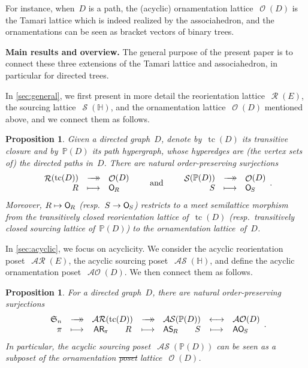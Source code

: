 \documentclass{amsart}
\newtheorem{proposition}[theorem]{Proposition}
\theoremstyle{definition}
\renewcommand{\c}[1]{\mathcal{#1}} %
\newcommand{\surjection}{\longrightarrow\mathrel{\mkern-22mu}\rightarrow\,}
\newcommand{\bijection}{\longleftrightarrow}
\DeclareMathOperator{\tc}{tc} %
\newcommand{\para}[1]{\bigskip\noindent\textbf{#1}} %
\newcommand{\jose}[1]{{\color{red}#1}}
\newcommand{\fS}{\mathfrak{S}} %
\newcommand{\mymap}[2]{\mathsf{#1}_{\hspace{-.7pt}#2}}
\DeclareMathOperator{\Orn}{\c{O}}  %
\newcommand{\orn}[1]{\mymap{O}{#1}}  %
\DeclareMathOperator{\AOrn}{\c{AO}}  %
\newcommand{\aorn}[1]{\mymap{AO}{#1}}  %
\DeclareMathOperator{\Reori}{\c{R}}  %
\DeclareMathOperator{\AReori}{\c{AR}}  %
\newcommand{\areori}[1]{\mymap{AR}{#1}}  %
\DeclareMathOperator{\Sour}{\mathcal{S}}  %
\DeclareMathOperator{\ASour}{\mathcal{AS}}  %
\newcommand{\asour}[1]{\mymap{AS}{#1}}  %
\newcommand{\HH}{\mathbb H}  %
\newcommand{\PP}{\mathbb P} %
\begin{document}
For instance, when~$D$ is a path, the (acyclic) ornamentation lattice~$\Orn(D)$ is the Tamari lattice which is indeed realized by the associahedron, and the ornamentations can be seen as bracket vectors of binary trees.


\medskip
\para{Main results and overview.}
The general purpose of the present paper is to connect these three extensions of the Tamari lattice and associahedron, in particular for directed trees.

In \cref{sec:general}, we first present in more detail the reorientation lattice~$\Reori(E)$, the sourcing lattice~$\Sour(\HH)$, and the ornamentation lattice~$\Orn(D)$ mentioned above, and we connect them as follows.

\begin{proposition}
Given a directed graph~$D$, denote by~$\tc(D)$ its transitive closure and by~$\PP(D)$ its path hypergraph, whose hyperedges are (the vertex sets of) the directed paths in~$D$.
There are natural order-preserving surjections
\[
\begin{array}{rcl}
	\Reori(\tc(D)) & \surjection & \Orn(D) \\
	R & \longmapsto & \orn{R}
\end{array}
\qquad\text{and}\qquad
\begin{array}{rcl}
	\Sour(\PP(D)) & \surjection & \Orn(D) \\
	S & \longmapsto & \orn{S}
\end{array}
.
\]
Moreover, $R \mapsto \orn{R}$ (resp.~$S \to \orn{S}$) restricts to a meet semilattice morphism from the transitively closed reorientation lattice of~$\tc(D)$ (resp.~transitively closed sourcing lattice of~$\PP(D)$) to the ornamentation lattice~of~$D$.
\end{proposition}

In \cref{sec:acyclic}, we focus on acyclicity.
We consider the acyclic reorientation poset~$\AReori(E)$, the acyclic sourcing poset~$\ASour(\HH)$, and define the acyclic ornamentation poset~$\AOrn(D)$. We then connect them as follows.

\begin{proposition}
For a directed graph~$D$, there are natural order-preserving surjections
\[
\begin{array}{rcccccl}
	\fS_n & \surjection & \AReori(\tc(D)) & \surjection & \ASour(\PP(D)) & \bijection & \AOrn(D) \\
	\pi & \longmapsto & \areori{\pi} \qquad R & \longmapsto & \asour{R} \qquad S & \longmapsto & \aorn{S}
\end{array}
.
\]
In particular, the acyclic sourcing poset~$\ASour(\PP(D))$ can be seen as a subposet of the ornamentation \jose{\sout{poset} lattice}~$\Orn(D)$.
\end{proposition}
\end{document}
